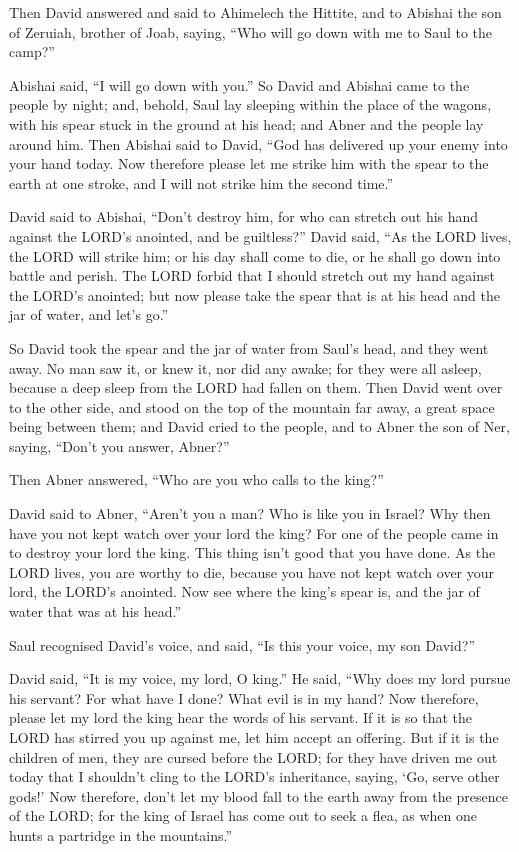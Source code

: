  Then David answered and said to Ahimelech the Hittite, and
to Abishai the son of Zeruiah, brother of Joab, saying, ``Who will go
down with me to Saul to the camp?''

Abishai said, ``I will go down with you.''  So David and
Abishai came to the people by night; and, behold, Saul lay sleeping
within the place of the wagons, with his spear stuck in the ground at
his head; and Abner and the people lay around him.  Then
Abishai said to David, ``God has delivered up your enemy into your hand
today. Now therefore please let me strike him with the spear to the
earth at one stroke, and I will not strike him the second time.''

 David said to Abishai, ``Don't destroy him, for who can
stretch out his hand against the LORD's anointed, and be guiltless?''
 David said, ``As the LORD lives, the LORD will strike him;
or his day shall come to die, or he shall go down into battle and
perish.  The LORD forbid that I should stretch out my hand
against the LORD's anointed; but now please take the spear that is at
his head and the jar of water, and let's go.''

 So David took the spear and the jar of water from Saul's
head, and they went away. No man saw it, or knew it, nor did any awake;
for they were all asleep, because a deep sleep from the LORD had fallen
on them.  Then David went over to the other side, and stood
on the top of the mountain far away, a great space being between them;
 and David cried to the people, and to Abner the son of
Ner, saying, ``Don't you answer, Abner?''

Then Abner answered, ``Who are you who calls to the king?''

 David said to Abner, ``Aren't you a man? Who is like you
in Israel? Why then have you not kept watch over your lord the king? For
one of the people came in to destroy your lord the king. 
This thing isn't good that you have done. As the LORD lives, you are
worthy to die, because you have not kept watch over your lord, the
LORD's anointed. Now see where the king's spear is, and the jar of water
that was at his head.''

 Saul recognised David's voice, and said, ``Is this your
voice, my son David?''

David said, ``It is my voice, my lord, O king.''  He said,
``Why does my lord pursue his servant? For what have I done? What evil
is in my hand?  Now therefore, please let my lord the king
hear the words of his servant. If it is so that the LORD has stirred you
up against me, let him accept an offering. But if it is the children of
men, they are cursed before the LORD; for they have driven me out today
that I shouldn't cling to the LORD's inheritance, saying, `Go, serve
other gods!'  Now therefore, don't let my blood fall to the
earth away from the presence of the LORD; for the king of Israel has
come out to seek a flea, as when one hunts a partridge in the
mountains.''

